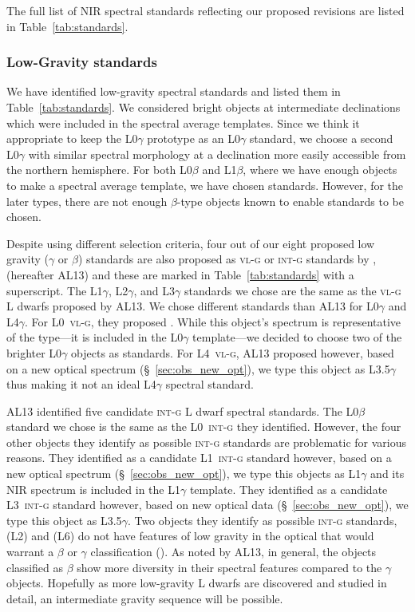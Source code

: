 \documentclass[12pt,preprint]{aastex}
\begin{document}
The full list of NIR spectral standards reflecting our proposed revisions are listed in Table~\ref{tab:standards}.

\subsubsection{Low-Gravity standards}

We have identified low-gravity spectral standards and listed them in Table~\ref{tab:standards}.
We considered bright objects at intermediate declinations which were included in the spectral average templates. 
Since we think it appropriate to keep the L0$\gamma$ prototype  as an L0$\gamma$ standard, we choose a second L0$\gamma$ with similar spectral morphology at a declination more easily accessible from the northern hemisphere. 
For both L0$\beta$ and L1$\beta$, where we have enough objects to make a spectral average template, we have chosen standards.
However, for the later types, there are not enough $\beta$-type objects known to enable standards to be chosen.

Despite using different selection criteria, four out of our eight proposed low gravity ($\gamma$ or $\beta$) standards are also proposed as \textsc{vl-g} or \textsc{int-g} standards by \citet{Allers:2013hk}, (hereafter AL13) and these are marked in Table~\ref{tab:standards} with a superscript.
The L1$\gamma$, L2$\gamma$, and L3$\gamma$ standards we chose are the same as the \textsc{vl-g} L dwarfs proposed by AL13. 
We chose different standards than AL13 for L0$\gamma$ and L4$\gamma$.
For L0~\textsc{vl-g}, they proposed . While this object's spectrum is representative of the type---it is included in the L0$\gamma$ template---we decided to choose two of the brighter L0$\gamma$ objects as standards.
For L4~\textsc{vl-g}, AL13 proposed  however, based on a new optical spectrum (\S~\ref{sec:obs_new_opt}), we type this object as L3.5$\gamma$ thus making it not an ideal L4$\gamma$ spectral standard. 

AL13 identified five candidate \textsc{int-g} L dwarf spectral standards. 
The L0$\beta$ standard we chose is the same as the L0~\textsc{int-g} they identified. 
However, the four other objects they identify as possible \textsc{int-g} standards are problematic for various reasons.
They identified  as a candidate L1~\textsc{int-g} standard however, based on a new optical spectrum (\S~\ref{sec:obs_new_opt}), we type this objects as L1$\gamma$ and its NIR spectrum is included in the L1$\gamma$ template. 
They identified  as a candidate L3~\textsc{int-g} standard however, based on new optical data (\S~\ref{sec:obs_new_opt}), we type this object as L3.5$\gamma$. 
Two objects they identify as possible \textsc{int-g} standards,  (L2) and  (L6) do not have features of low gravity in the optical that would warrant a $\beta$ or $\gamma$ classification (\cite{Cruz07,K00}).
As noted by AL13, in general, the objects classified as $\beta$ show more diversity in their spectral features compared to the $\gamma$ objects. Hopefully as more low-gravity L dwarfs are discovered and studied in detail, an intermediate gravity sequence will be possible.
\end{document}
